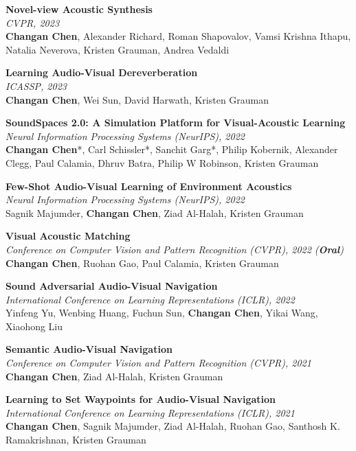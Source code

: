 \documentclass[margin, 10pt]{res} %
\begin{document}
\begin{resume}
\textbf{Novel-view Acoustic Synthesis} \\
\textit{CVPR, 2023} \\
\textbf{Changan Chen}, Alexander Richard, Roman Shapovalov, Vamsi Krishna Ithapu, Natalia Neverova, Kristen Grauman, Andrea Vedaldi

\textbf{Learning Audio-Visual Dereverberation} \\
\textit{ICASSP, 2023} \\
\textbf{Changan Chen}, Wei Sun, David Harwath, Kristen Grauman

\textbf{SoundSpaces 2.0: A Simulation Platform for Visual-Acoustic Learning} \\
\textit{Neural Information Processing Systems (NeurIPS), 2022} \\
\textbf{Changan Chen}*, Carl Schissler*, Sanchit Garg*, Philip Kobernik, Alexander Clegg, Paul Calamia, Dhruv Batra, Philip W Robinson, Kristen Grauman

\textbf{Few-Shot Audio-Visual Learning of Environment Acoustics} \\
\textit{Neural Information Processing Systems (NeurIPS), 2022} \\
Sagnik Majumder, \textbf{Changan Chen}, Ziad Al-Halah, Kristen Grauman

\textbf{Visual Acoustic Matching} \\
\textit{Conference on Computer Vision and Pattern Recognition (CVPR), 2022 (\textbf{Oral})} \\
\textbf{Changan Chen}, Ruohan Gao, Paul Calamia, Kristen Grauman

\textbf{Sound Adversarial Audio-Visual Navigation} \\
\textit{International Conference on Learning Representations (ICLR), 2022} \\
Yinfeng Yu, Wenbing Huang, Fuchun Sun, \textbf{Changan Chen}, Yikai Wang, Xiaohong Liu

\textbf{Semantic Audio-Visual Navigation} \\
\textit{Conference on Computer Vision and Pattern Recognition (CVPR), 2021} \\
\textbf{Changan Chen}, Ziad Al-Halah, Kristen Grauman

\textbf{Learning to Set Waypoints for Audio-Visual Navigation} \\
\textit{International Conference on Learning Representations (ICLR), 2021} \\
\textbf{Changan Chen}, Sagnik Majumder, Ziad Al-Halah, Ruohan Gao, Santhosh K. Ramakrishnan, Kristen Grauman


\end{resume}
\end{document}
